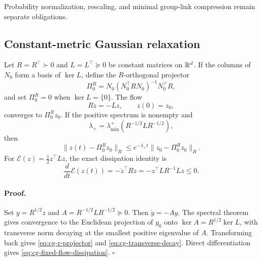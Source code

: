 Probability normalization, rescaling, and minimal group-link compression remain
separate obligations. 

\subsection{Constant-metric Gaussian relaxation}
\label{sec:cg-gaussian-fixed-relaxation}

Let \(R=R^\top\succ0\) and \(L=L^\top\succeq0\) be constant matrices on
\(\mathbb R^d\). If the columns of \(N_0\) form a basis of \(\ker L\), define the
\(R\)-orthogonal projector
\begin{equation}
\Pi_0^R=N_0(N_0^\top RN_0)^{-1}N_0^\top R,
\label{eq:cg-r-projector}
\end{equation}
and set \(\Pi_0^R=0\) when \(\ker L=\{0\}\). The flow
\begin{equation}
R\dot z=-Lz,\qquad z(0)=z_0,
\label{eq:cg-constant-metric-flow}
\end{equation}
converges to \(\Pi_0^Rz_0\). If the positive spectrum is nonempty and
\begin{equation}
\lambda_+
=\lambda_{\min}^{+}(R^{-1/2}LR^{-1/2}),
\label{eq:cg-transverse-rate}
\end{equation}
then
\begin{equation}
\|z(t)-\Pi_0^Rz_0\|_R
\leq e^{-\lambda_+t}
\|z_0-\Pi_0^Rz_0\|_R.
\label{eq:cg-transverse-decay}
\end{equation}
For \(\mathcal E(z)=\tfrac12z^\top Lz\), the exact dissipation identity is
\begin{equation}
\frac{d}{dt}\mathcal E(z(t))
=-\dot z^\top R\dot z
=-z^\top LR^{-1}Lz\leq0.
\label{eq:cg-fixed-flow-dissipation}
\end{equation}

\paragraph{Proof.}
Set \(y=R^{1/2}z\) and
\(A=R^{-1/2}LR^{-1/2}\succeq0\). Then
\(\dot y=-Ay\). The spectral theorem gives convergence to the Euclidean
projection of \(y_0\) onto \(\ker A=R^{1/2}\ker L\), with transverse norm
decaying at the smallest positive eigenvalue of \(A\). Transforming back
gives \eqref{eq:cg-r-projector} and \eqref{eq:cg-transverse-decay}. Direct
differentiation gives \eqref{eq:cg-fixed-flow-dissipation}. \(\square\)

